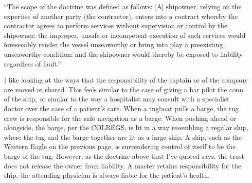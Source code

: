 
\date{Admiralty Law -- 21 February 2024}


\begin{flushleft}
\thetitle

\thedate

\theauthor
\end{flushleft}

``The scope of the doctrine was defined as follows: [A] shipowner, relying on the expertise of another party (the contractor), enters into a contract whereby the contractor agrees to perform services without supervision or control by the shipowner; the improper, unsafe or incompetent execution of such services would foreseeably render the vessel unseaworthy or bring into play a preexisting unseaworthy condition; and the shipowner would thereby be exposed to liability regardless of fault.''  %

I like looking at the ways that the responsibility of the captain or of the company are moved or shared. This feels similar to the case of giving a bar pilot the conn of the ship, or similar to the way a hospitalist may consult with a specialist doctor over the case of a patient’s care. When a tugboat pulls a barge, the tug crew is responsible for the safe navigation as a barge. When pushing ahead or alongside, the barge, per the COLREGS, is lit in a way resembling a regular ship, where the tug and the barge together are lit as a large ship. A ship, such as the Western Eagle on the previous page, is surrendering control of itself to be the barge of the tug. However, as the doctrine above that I’ve quoted says, the trust does not release the owner from liability. A master retains responsibility for the ship, the attending physician is always liable for the patient’s health.

